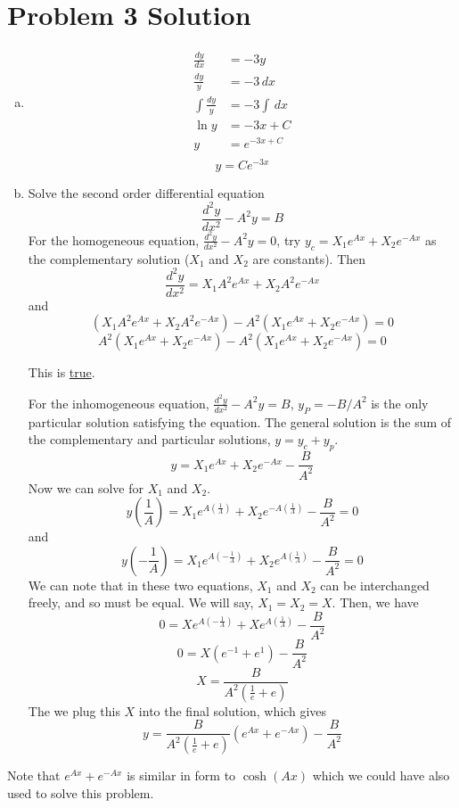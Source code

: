 \section*{Problem 3 Solution}

\begin{enumerate}[a)]

\item 

\begin{align*}
\frac{dy}{dx}	&= -3y \\
\frac{dy}{y} 	& = -3\,dx \\
\int\frac{dy}{y}&= -3 \int \,dx \\
\ln y			&= -3 x + C \\
y				&= e^{-3x + C} \\
\end{align*}
$$\boxed{y = Ce^{-3x}}$$

\item 

Solve the second order differential equation
$$ \frac{d^2 y}{dx^2} - A^2y = B $$
For the homogeneous equation, $\frac{d^2 y}{dx^2} - A^2y = 0$, try $y_c = X_1 e^{Ax} + X_2 e^{-Ax}$ as the complementary solution ($X_1$ and $X_2$ are constants). Then
$$ \frac{d^2 y}{dx^2} = X_1 A^2 e^{Ax} + X_2 A^2 e^{-Ax} $$
and
$$ (X_1 A^2 e^{Ax} + X_2 A^2 e^{-Ax}) - A^2(X_1 e^{Ax} + X_2 e^{-Ax}) = 0 $$
$$ A^2 (X_1 e^{Ax} + X_2 e^{-Ax}) - A^2 (X_1 e^{Ax} + X_2 e^{-Ax}) = 0 $$

This is \underline{true}.

For the inhomogeneous equation, $\frac{d^2 y}{dx^2} - A^2y = B$, $y_P = -B/A^2$ is the only particular solution satisfying the equation. The general solution is the sum of the complementary and particular solutions, $y = y_c + y_p$. 
$$ y = X_1 e^{Ax} + X_2 e^{-Ax} - \frac{B}{A^2} $$
Now we can solve for $X_1$ and $X_2$. 
$$ y(\frac{1}{A}) = X_1 e^{A(\frac{1}{A})} + X_2 e^{-A(\frac{1}{A})} - \frac{B}{A^2} = 0 $$
and
$$ y(-\frac{1}{A}) = X_1 e^{A(-\frac{1}{A})} + X_2 e^{A(\frac{1}{A})} - \frac{B}{A^2} = 0 $$
We can note that in these two equations, $X_1$ and $X_2$ can be interchanged freely, and so must be equal. We will say, $X_1 = X_2 = X$. Then, we have
$$ 0 = X e^{A(-\frac{1}{A})} + X e^{A(\frac{1}{A})} - \frac{B}{A^2} $$
$$ 0 = X (e^{-1} + e^{1}) - \frac{B}{A^2} $$
$$ X = \frac{B}{A^2(\frac{1}{e} + e)} $$
The we plug this $X$ into the final solution, which gives
$$ y = \frac{B}{A^2(\frac{1}{e} + e)} (e^{Ax} + e^{-Ax}) - \frac{B}{A^2} $$
\end{enumerate}
Note that $e^{Ax} + e^{-Ax}$ is similar in form to $\cosh(Ax)$ which we could have also used to solve this problem.


